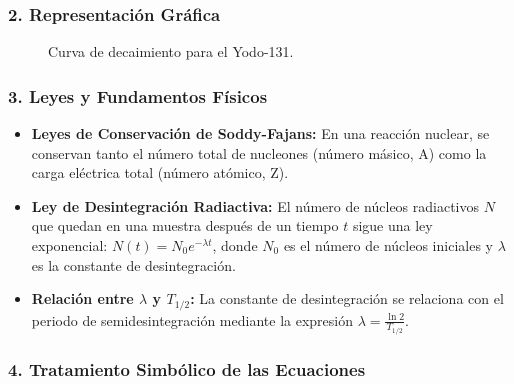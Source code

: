 \subsubsection*{2. Representación Gráfica}
\begin{figure}[H]
    \centering
    \caption{Curva de decaimiento para el Yodo-131.}
\end{figure}

\subsubsection*{3. Leyes y Fundamentos Físicos}
\begin{itemize}
    \item \textbf{Leyes de Conservación de Soddy-Fajans:} En una reacción nuclear, se conservan tanto el número total de nucleones (número másico, A) como la carga eléctrica total (número atómico, Z).
    \item \textbf{Ley de Desintegración Radiactiva:} El número de núcleos radiactivos $N$ que quedan en una muestra después de un tiempo $t$ sigue una ley exponencial: $N(t) = N_0 e^{-\lambda t}$, donde $N_0$ es el número de núcleos iniciales y $\lambda$ es la constante de desintegración.
    \item \textbf{Relación entre $\lambda$ y $T_{1/2}$:} La constante de desintegración se relaciona con el periodo de semidesintegración mediante la expresión $\lambda = \frac{\ln 2}{T_{1/2}}$.
\end{itemize}

\subsubsection*{4. Tratamiento Simbólico de las Ecuaciones}
